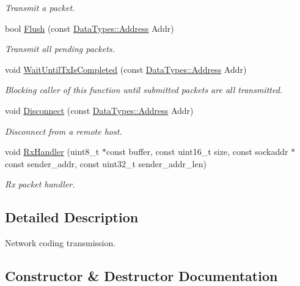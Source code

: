 \begin{DoxyCompactItemize}
\begin{DoxyCompactList}\small\item\em Transmit a packet. \end{DoxyCompactList}\item 
bool \hyperlink{class_network_coding_1_1_transmission_a4c843d9330d4c073e69ce82890012e6a}{Flush} (const \hyperlink{class_network_coding_1_1_data_types_1_1_address}{Data\+Types\+::\+Address} Addr)
\begin{DoxyCompactList}\small\item\em Transmit all pending packets. \end{DoxyCompactList}\item 
void \hyperlink{class_network_coding_1_1_transmission_a3b9dae872646600c26c7dd2864205d25}{Wait\+Until\+Tx\+Is\+Completed} (const \hyperlink{class_network_coding_1_1_data_types_1_1_address}{Data\+Types\+::\+Address} Addr)
\begin{DoxyCompactList}\small\item\em Blocking caller of this function until submitted packets are all transmitted. \end{DoxyCompactList}\item 
void \hyperlink{class_network_coding_1_1_transmission_a5de9d315363eae64e7395c3d0ed6ae3b}{Disconnect} (const \hyperlink{class_network_coding_1_1_data_types_1_1_address}{Data\+Types\+::\+Address} Addr)
\begin{DoxyCompactList}\small\item\em Disconnect from a remote host. \end{DoxyCompactList}\item 
void \hyperlink{class_network_coding_1_1_transmission_ab363fc5b8d61a9fee2ab0331c1d1938e}{Rx\+Handler} (uint8\+\_\+t $\ast$const buffer, const uint16\+\_\+t size, const sockaddr $\ast$const sender\+\_\+addr, const uint32\+\_\+t sender\+\_\+addr\+\_\+len)
\begin{DoxyCompactList}\small\item\em Rx packet handler. \end{DoxyCompactList}\end{DoxyCompactItemize}


\subsection{Detailed Description}
Network coding transmission. 

\subsection{Constructor \& Destructor Documentation}
